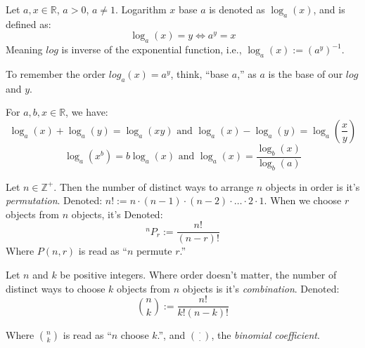 \begin{Def}[Logarithm]

    Let $a,x\in\mathbb{R}$, $a>0$, $a\neq 1$. Logarithm $x$ base $a$ is denoted as $\log_a(x)$, and is defined as:
    \Large
    \[\log_a(x)=y\Longleftrightarrow a^y=x\]
    \normalsize
    Meaning $log$ is inverse of the exponential function, i.e., $\log_a(x):=(a^y)^{-1}$.
\end{Def}
\begin{Tip}
    To remember the order $log_a(x)=a^y$, think, ``base $a$,'' as $a$ is the base of our $log$ and $y$.
\end{Tip}

\begin{theo}

    \label{thm:logrules}
    
    For $a,b,x\in\mathbb{R}$, we have:
    \Large
    \[\log_a(x)+\log_a(y)=\log_a(xy) \text{ and } \log_a(x)-\log_a(y)=\log_a\left(\dfrac{x}{y}\right)\]
    \[\log_a(x^b)=b\log_a(x) \text{ and } \log_a(x)=\dfrac{\log_b(x)}{\log_b(a)}\]
    \normalsize
\end{theo}

\newpage

\begin{Def}[Permutations]
    
        Let $n\in\mathbb{Z^+}$. Then the number of distinct ways to arrange $n$ objects in order is it's \textit{ permutation}. Denoted:
        $n!:=n\cdot(n-1)\cdot(n-2)\cdot\ldots\cdot2\cdot1$.
         When we choose $r$ objects from $n$ objects, it's Denoted:
        \Large
        \[^nP_r:=\dfrac{n!}{(n-r)!}\]
        \normalsize
        Where $P(n,r)$ is read as ``$n$ permute $r$.''
\end{Def}

\begin{Def}[Combinations]

    Let $n$ and $k$ be positive integers. Where order doesn't matter, the number of distinct ways to choose $k$ objects from $n$ objects is it's \textit{combination}. Denoted:
    \Large
    \[\binom{n}{k}:=\dfrac{n!}{k!(n-k)!}\]
    \normalsize

    \noindent
    Where $\binom{n}{k}$ is read as ``$n$ choose $k$.'', and $\binom{\cdot}{\cdot}$, the \textit{binomial coefficient}.
    
\end{Def}

